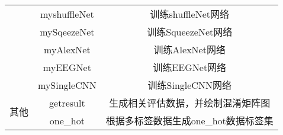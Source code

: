 \begin{table}[!ht]
{\begin{tabular}{|c|c|c|}
			& myshuffleNet    & 训练shuffleNet网络                                            \\ \cline{2-3} 
			& mySqeezeNet     & 训练SqueezeNet网络                                            \\ \cline{2-3} 
			& myAlexNet       & 训练AlexNet网络                                               \\ \cline{2-3} 
			& myEEGNet        & 训练EEGNet网络                                                \\ \cline{2-3} 
			& mySingleCNN     & 训练SingleCNN网络                                             \\ \hline
			\multirow{2}{*}{其他}    & getresult       & 生成相关评估数据，并绘制混淆矩阵图                                         \\ \cline{2-3} 
			& one\_hot        & 根据多标签数据生成one\_hot数据标签集                                    \\ \hline
		\end{tabular}
	}
\end{table}

\listoffigures
{}
\cleardoublepage

\newpage

\listoftables
{}
\newpage

\clearpage
\endinput
